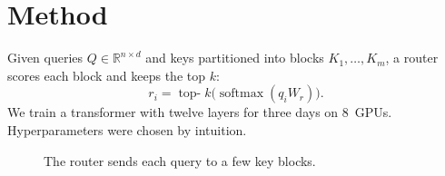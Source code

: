 \section{Method}
\label{sec:method}
Given queries $Q \in \mathbb{R}^{n \times d}$ and keys partitioned into blocks
$K_1, \dots, K_m$, a router scores each block and keeps the top $k$:
\begin{equation}
  r_i = \operatorname{top-}k\big(\operatorname{softmax}(q_i W_r)\big).
\end{equation}
We train a transformer with twelve layers for three days on 8~GPUs.
Hyperparameters were chosen by intuition.

\begin{figure}[t]
  \centering
  \caption{The router sends each query to a few key blocks.}
\end{figure}
